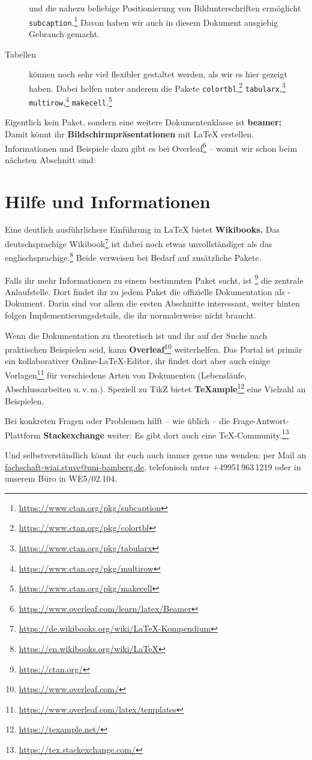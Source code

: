 \begin{description}
		und die nahezu beliebige Positionierung von Bildunterschriften ermöglicht \texttt{subcaption}.\footnote{\url{https://www.ctan.org/pkg/subcaption}}
		Davon haben wir auch in diesem Dokument ausgiebig Gebrauch gemacht.
	\item[Tabellen]
		können noch sehr viel flexibler gestaltet werden, als wir es hier gezeigt haben.
		Dabei helfen unter anderem die Pakete
		\texttt{colortbl},\footnote{\url{https://www.ctan.org/pkg/colortbl}}
		\texttt{tabularx},\footnote{\url{https://www.ctan.org/pkg/tabularx}}
		\texttt{multirow},\footnote{\url{https://www.ctan.org/pkg/multirow}}
		\texttt{makecell}.\footnote{\url{https://www.ctan.org/pkg/makecell}}
\end{description}

\noindent Eigentlich kein Paket, sondern eine weitere Dokumentenklasse ist \textbf{beamer:} Damit könnt ihr \textbf{Bildschirmpräsentationen} mit \LaTeX{} erstellen.
Informationen und Beispiele dazu gibt es bei Overleaf\footnote{\url{https://www.overleaf.com/learn/latex/Beamer}} –
womit wir schon beim nächsten Abschnitt sind:

\section{Hilfe und Informationen}

Eine deutlich ausführlichere Einführung in \LaTeX{} bietet \textbf{Wikibooks.}
Das deutschsprachige Wikibook\footnote{\url{https://de.wikibooks.org/wiki/LaTeX-Kompendium}} ist dabei noch etwas unvollständiger als das englischsprachige.\footnote{\url{https://en.wikibooks.org/wiki/LaTeX}}
Beide verweisen bei Bedarf auf zusätzliche Pakete.

Falls ihr mehr Informationen zu einem bestimmten Paket sucht, ist \footnote{\url{https://ctan.org/}} die zentrale Anlaufstelle.
Dort findet ihr zu jedem Paket die offizielle Dokumentation als -Dokument.
Darin sind vor allem die ersten Abschnitte interessant, weiter hinten folgen Implementierungsdetails, die ihr normalerweise nicht braucht.

Wenn die Dokumentation zu theoretisch ist und ihr auf der Suche nach praktischen Beispielen seid, kann \textbf{Overleaf}\footnote{\url{https://www.overleaf.com/}} weiterhelfen.
Das Portal ist primär ein kollaborativer Online-\LaTeX-Editor, ihr findet dort aber auch einige Vorlagen\footnote{\url{https://www.overleaf.com/latex/templates}} für verschiedene Arten von Dokumenten (Lebensläufe, Abschlussarbeiten u.\,v.\,m.).
Speziell zu TikZ bietet \textbf{\TeX{}ample}\footnote{\url{https://texample.net/}} eine Vielzahl an Beispielen.

Bei konkreten Fragen oder Problemen hilft – wie üblich – die Frage-Antwort-Plattform \textbf{Stackexchange} weiter:
Es gibt dort auch eine \TeX-Community.\footnote{\url{https://tex.stackexchange.com/}}

Und selbstverständlich könnt ihr euch auch immer gerne uns wenden:
per Mail an \href{mailto:fachschaft-wiai.stuve@uni-bamberg.de}{fachschaft-wiai.stuve@uni-bamberg.de}, telefonisch unter +49951\,963\,1219 oder in unserem Büro in WE5/02.104.
